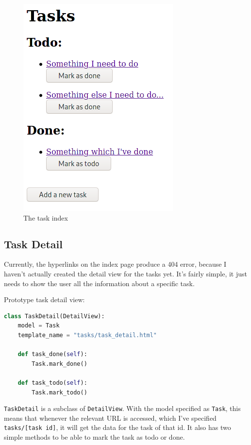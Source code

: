 \documentclass{article}
\begin{document}
\begin{figure}[H]
	\centering
	\includegraphics[width=0.6\linewidth]{Screenshots/task_index.png}
	\caption{The task index}
	\label{fig:task_index1}
\end{figure}

\subsection{Task Detail}
Currently,
the hyperlinks on the index page produce a 404 error,
because I haven't actually created the detail view for the tasks yet.
It's fairly simple,
it just needs to show the user all the information about a specific task.

Prototype task detail view:
\begin{lstlisting}[language=Python]
class TaskDetail(DetailView):
    model = Task
    template_name = "tasks/task_detail.html"

    def task_done(self):
        Task.mark_done()

    def task_todo(self):
        Task.mark_todo()
\end{lstlisting}

\texttt{TaskDetail} is a subclass of \texttt{DetailView}.
With the model specified as \texttt{Task},
this means that whenever the relevant URL is accessed,
which I've specified \texttt{tasks/[task id]},
it will get the data for the task of that id.
It also has two simple methods to be able to mark the task as todo or done.
\end{document}
